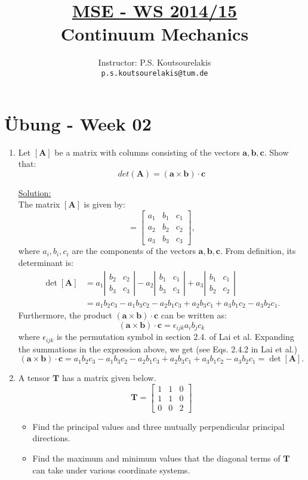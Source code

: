 \documentclass{article}
\title{\underline{MSE - WS 2014/15}\\
Continuum Mechanics}
\author{
Instructor: P.S. Koutsourelakis  \\
\texttt{p.s.koutsourelakis@tum.de} \\
}
\newcommand{\ee}{\end{equation}}
\newcommand{\be}{\begin{equation}}
\newcommand{\bi}{\begin{itemize}}
\newcommand{\ei}{\end{itemize}}
\newcommand{\bs}{\boldsymbol}
\begin{document}
\makeanontitle

%

\section*{\"Ubung - Week 02}


\begin{enumerate}
\item Let $[\bs{A}]$ be a matrix with columns consisting of the vectors $\bs{a,b,c}$. Show that:
\be
det(\bs{A})=(\bs{a} \times \bs{b}) \cdot \bs{c}
\ee

\underline{Solution:} \\
The matrix $[\bs{A}]$ is given by:
\be
[\bs{A}]=\left[ \begin{array}{lll} a_1 & b_1 & c_1 \\ a_2 & b_2 & c_2\\ a_3 & b_3 & c_3 \end{array} \right],
\ee
where $a_i,b_i,c_i$ are the components of the vectors $\bs{a,b,c}$.
From definition, its determinant is:
\be
\begin{array}{ll}
\det [\bs{A}] &=a_1 \left| \begin{array}{ll}  b_2 & c_2 \\  b_3 & c_3 \end{array} \right|-a_2\left| \begin{array}{ll}  b_1 & c_1 \\  b_3 & c_3 \end{array}
\right|+a_3 \left|\begin{array}{ll}  b_1 & c_1 \\  b_2 & c_2 \end{array} \right| \\
&=a_1b_2c_3-a_1b_3c_2-a_2b_1c_3+a_2b_3c_1+a_3b_1c_2-a_3b_2c_1.
\end{array}
\ee
Furthermore, the product $(\bs{a} \times \bs{b}) \cdot \bs{c}$ can be written as:
\be
(\bs{a} \times \bs{b}) \cdot \bs{c}=\epsilon_{ijk}a_ib_jc_k
\ee
where $\epsilon_{ijk}$ is the permutation symbol in section 2.4. of Lai et al. Expanding the summations in the expression above, we get (see Eqs. 2.4.2 in Lai
et al.)
\be
(\bs{a} \times \bs{b}) \cdot \bs{c}=a_1b_2c_3-a_1b_3c_2-a_2b_1c_3+a_2b_3c_1+a_3b_1c_2-a_3b_2c_1=\det [\bs{A}].
\ee
\item   A tensor $\bs{T}$ has a matrix given below.
\be
\bs{T}=\left[\begin{array}{lll}
   1&  1 & 0 \\          1 & 1 & 0 \\ 0 & 0 & 2 
             \end{array}
\right]
\ee
\bi
\item  Find the principal values and three mutually perpendicular principal directions.
\item Find the maximum and minimum values that  the diagonal terms of $\bs{T}$ can take under various coordinate systems.
\ei


\end{enumerate}
\end{document}
